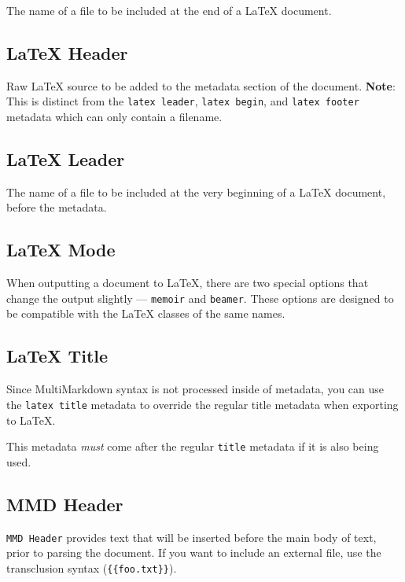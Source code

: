 The name of a file to be included at the end of a LaTeX document.

\subsection{LaTeX Header}
\label{latexheader}

Raw LaTeX source to be added to the metadata section of the document. \textbf{Note}: This is distinct from the \texttt{latex leader}, \texttt{latex begin}, and \texttt{latex footer} metadata which can only contain a filename.

\subsection{LaTeX Leader}
\label{latexleader}

The name of a file to be included at the very beginning of a LaTeX document, before the metadata.

\subsection{LaTeX Mode}
\label{latexmode}

When outputting a document to LaTeX, there are two special options that change
the output slightly --- \texttt{memoir} and \texttt{beamer}. These options are designed to
be compatible with the LaTeX classes of the same names.

\subsection{LaTeX Title}
\label{latextitle}

Since MultiMarkdown syntax is not processed inside of metadata, you can use the \texttt{latex title} metadata to override the regular title metadata when exporting to LaTeX.

This metadata \emph{must} come after the regular \texttt{title} metadata if it is also being used.

\subsection{MMD Header}
\label{mmdheader}

\texttt{MMD Header} provides text that will be inserted before the main body of text, prior to parsing the document. If you want to include an external file, use the transclusion syntax (\texttt{\{\{foo.txt\}\}}).

